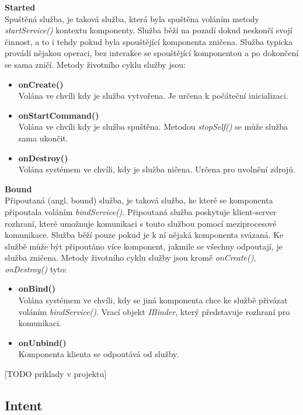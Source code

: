 \documentclass{diplomka}
\begin{document}
\begin{description}[]
\item \textbf{Started}\\
Spuštěná služba, je taková služba, která byla spuštěna voláním metody \emph{startService()} kontextu komponenty. Služba běží na pozadí dokud neskončí svojí činnost, a to i tehdy pokud byla spouštějící komponenta zničena. Služba typicka provádí nějakou operaci, bez interakce se spouštějící komponentou a po dokončení se sama zničí. Metody životního cyklu služby jsou: 
\begin{itemize}[]
\item \textbf{onCreate()}\\
Volána ve chvíli kdy je služba vytvořena. Je určena k počáteční inicializaci.
\item \textbf{onStartCommand()}\\
Volána ve chvíli kdy je služba spuštěna. Metodou \emph{stopSelf()} se může služba sama ukončit.
\item \textbf{onDestroy()}\\
Volána systémem ve chvíli, kdy je služba ničena. Určena pro uvolnění zdrojů.
\end{itemize}
\item \textbf{Bound}\\
Připoutaná (angl. bound) služba, je taková služba, ke které se komponenta připoutala voláním \emph{bindService()}. Připoutaná služba poskytuje klient-server rozhraní, které umožnuje komunikaci s touto službou pomocí meziprocesové komunikace. Služba běží pouze pokud je k ní nějaká komponenta svázaná. Ke službě může být připoutáno více komponent, jakmile se všechny odpoutají, je služba zničena. Metody životního cyklu služby jsou kromě \emph{onCreate()}, \emph{onDestroy()} tyto:
\begin{itemize}[]
\item \textbf{onBind()}\\
Volána systémem ve chvíli, kdy se jiná komponenta chce ke službě přivázat voláním \emph{bindService()}. Vrací objekt \emph{IBinder}, který představuje rozhraní pro komunikaci.
\item \textbf{onUnbind()}\\
Komponenta klienta se odpoutává od služby.
\end{itemize}
\end{description}
[TODO priklady v projektu]

\subsection{Intent}
\end{document}
